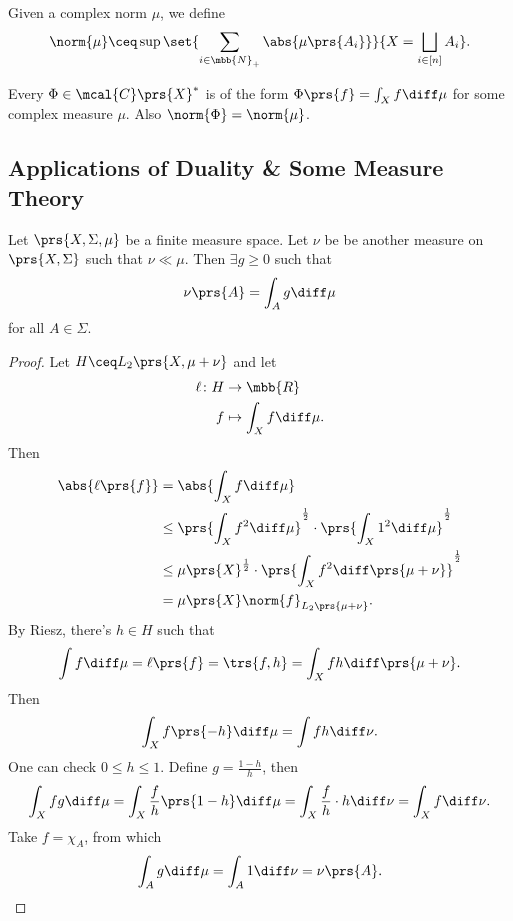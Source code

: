 \documentclass[10pt, twoside]{book}
\begin{document}
\begin{definition}
Given a complex norm $\mu$, we define
\[\norm{\mu} \ceq \sup\set{\sum_{i \in \mbb{N}_+} \abs{\mu\prs{A_i}}}{X = \bigsqcup_{i \in [n]} A_i} \text{.}\]
\end{definition}

\begin{theorem}
Every $\Phi \in \mcal{C}\prs{X}^*$ is of the form $\Phi\prs{f} = \int_X f \diff \mu$ for some complex measure $\mu$. Also
$\norm{\Phi} = \norm{\mu}$.
\end{theorem}

\subsection{Applications of Duality \& Some Measure Theory}

\begin{theorem}
Let $\prs{X, \Sigma, \mu}$ be a finite measure space. Let $\nu$ be be another measure on $\prs{X, \Sigma}$ such that $\nu \ll \mu$. Then $\exists g \geq 0$ such that
\[\nu\prs{A} = \int_A g \diff \mu\]
for all $A \in \Sigma$.
\end{theorem}

\begin{proof}
Let $H \ceq L_2\prs{X, \mu+\nu}$ and let
\begin{align*}
\ell \colon H &\to \mbb{R} \\
f &\mapsto \int_X f \diff \mu \text{.}
\end{align*}
Then
\begin{align*}
\abs{\ell\prs{f}} &=
\abs{\int_X f \diff \mu}
\\&\leq
\prs{\int_X f^2 \diff \mu}^{\frac{1}{2}} \cdot \prs{\int_X 1^2 \diff \mu}^{\frac{1}{2}}
\\&\leq
\mu\prs{X}^{\frac{1}{2}} \cdot \prs{\int_X f^2 \diff \prs{\mu + \nu}}^{\frac{1}{2}}
\\&=
\mu\prs{X} \norm{f}_{L_2\prs{\mu + \nu}} \text{.}
\end{align*}
By Riesz, there's $h \in H$ such that
\[\int f \diff \mu = \ell\prs{f} = \trs{f, h} = \int_X f h \diff \prs{\mu + \nu} \text{.}\]
Then \[\int_X f\prs{-h} \diff \mu = \int f h \diff \nu \text{.}\]
One can check
$0 \leq h \leq 1$. Define $g = \frac{1-h}{h}$, then
\[\int_X fg \diff \mu = \int_X \frac{f}{h} \prs{1-h} \diff \mu = \int_X \frac{f}{h} \cdot h \diff \nu = \int_X f \diff \nu \text{.}\]
Take $f = \chi_A$, from which
\[\int_A g \diff \mu = \int_A 1 \diff \nu = \nu\prs{A} \text{.}\]
\end{proof}
\end{document}
